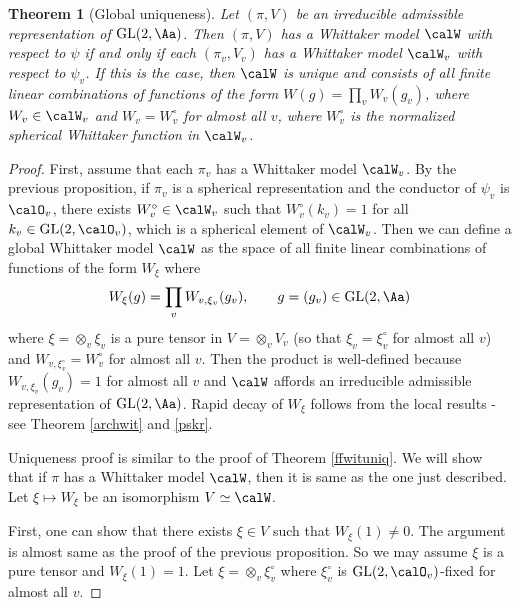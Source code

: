 \documentclass{article}
\newtheorem{theorem}{Theorem}[section]
\newcommand{\GL}{\mathrm{GL}}
\begin{document}
\begin{theorem}[Global uniqueness]
Let $(\pi, V)$ be an irreducible admissible representation of $\GL(2, \Aa)$. 
Then $(\pi, V)$ has a Whittaker model $\calW$ with respect to $\psi$ if and only if each $(\pi_v, V_v)$ has a Whittaker model $\calW_v$ with respect to $\psi_v$. 
If this is the case, then $\calW$ is unique and consists of all finite linear combinations of functions of the form $W(g) = \prod_{v} W_{v}(g_{v})$, where $W_{v}\in \calW_{v}$ and $W_{v} = W_{v}^{\circ}$ for almost all $v$, where $W_{v}^{\circ}$ is the normalized spherical Whittaker function in $\calW_v$. 
\end{theorem}
\begin{proof}
First, assume that each $\pi_v$ has a Whittaker model $\calW_v$. 
By the previous proposition, if $\pi_v$ is a spherical representation and the conductor of $\psi_v$ is $\calO_v$, there exists $W_v^{\circ} \in \calW_v$ such that $W_{v}^{\circ}(k_v) = 1$ for all $k_v\in \GL(2, \calO_v)$, which is a spherical element of $\calW_v$. 
Then we can define a global Whittaker model $\calW$ as the space of all finite linear combinations of functions of the form $W_{\xi}$ where 
$$
W_{\xi}(g) = \prod_{v} W_{v, \xi_v} (g_v), \qquad g = (g_v) \in \GL(2, \Aa)
$$
where $\xi = \otimes_v \xi_v$ is a pure tensor in $V = \otimes_v V_v$ (so that $\xi_v = \xi_v^{\circ}$ for almost all $v$) and $W_{v, \xi_v^{\circ}} = W_{v}^{\circ}$ for almost all $v$. 
Then the product is well-defined because $W_{v, \xi_v}(g_v) =1$ for almost all $v$ and $\calW$ affords an irreducible admissible representation of $\GL(2, \Aa)$. 
Rapid decay of $W_{\xi}$ follows from the local results - see Theorem \ref{archwit} and \ref{pskr}.

Uniqueness proof is similar to the proof of Theorem \ref{ffwituniq}. We will show that if $\pi$ has a Whittaker model $\calW$, then it is same as the one just described. Let $\xi\mapsto W_{\xi}$ be an isomorphism $V\simeq \calW$. 

First, one can show that there exists $\xi\in V$ such that $W_{\xi}(1) \neq 0$. The argument is almost same as the proof of the previous proposition. 
So we may assume $\xi$ is a pure tensor and $W_{\xi}(1) = 1$. Let $\xi = \otimes_v \xi_v^{\circ}$ where $\xi_v^{\circ}$ is $\GL(2, \calO_v)$-fixed for almost all $v$. 


\end{proof}
\end{document}
